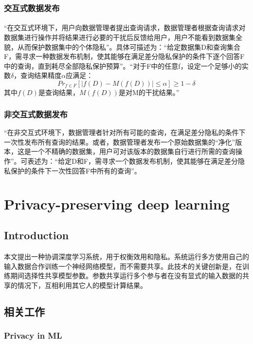 \documentclass[12pt,a4paper]{article}
\begin{document}
\subsubsection{交互式数据发布}
\paragraph{} “在交互式环境下，用户向数据管理者提出查询请求，数据管理者根据查询请求对数据集进行操作并将结果进行必要的干扰后反馈给用户，用户不能看到数据集全貌，从而保护数据集中的个体隐私”。具体可描述为：“给定数据集D和查询集合F，需寻求一种数据发布机制，使其能够在满足差分隐私保护的条件下逐个回答F中的查询，直到耗尽全部隐私保护预算”。“对于F中的任意f，设定一个足够小的实数$\delta$，查询结果精度$\alpha$应满足：
\begin{equation}
	Pr_{f\in F}[|f(D)-M(f(D))|\leq \alpha]\geq 1-\delta
\end{equation}
其中$f(D)$是查询结果，$M(f(D))$是对M的干扰结果。”
\subsubsection{非交互式数据发布} “在非交互式环境下，数据管理者针对所有可能的查询，在满足差分隐私的条件下一次性发布所有查询的结果。或者，数据管理者发布一个原始数据集的“净化”版本，这是一个不精确的数据集，用户可对该版本的数据集自行进行所需的查询操作”。可表述为：“给定D和F，需寻求一个数据发布机制，使其能够在满足差分隐私保护的条件下一次性回答F中所有的查询”。


\section{Privacy-preserving deep learning\cite{shokri2015ppdl}}
\subsection{Introduction}
\paragraph{} 本文提出一种协调深度学习系统，用于权衡效用和隐私。系统运行多方使用自己的输入数据合作训练一个神经网络模型，而不需要共享。此技术的关键创新是，在训练期间选择性共享模型参数。参数共享运行多个参与者在没有显式的输入数据的共享的情况下，互相利用其它人的模型计算结果。

\subsection{相关工作}
\subsubsection{Privacy in ML}
\end{document}
